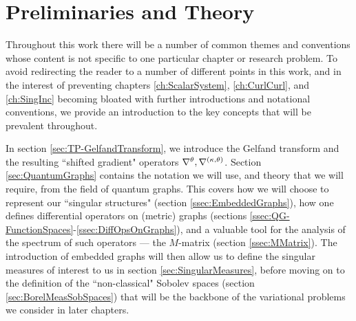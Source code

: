 \chapter{Preliminaries and Theory} \label{ch:TheoryPrelims}
Throughout this work there will be a number of common themes and conventions whose content is not specific to one particular chapter or research problem.
To avoid redirecting the reader to a number of different points in this work, and in the interest of preventing chapters \ref{ch:ScalarSystem}, \ref{ch:CurlCurl}, and \ref{ch:SingInc} becoming bloated with further introductions and notational conventions, we provide an introduction to the key concepts that will be prevalent throughout.

In section \ref{sec:TP-GelfandTransform}, we introduce the Gelfand transform and the resulting ``shifted gradient" operators $\nabla^{\theta}, \nabla^{\left( \kappa, \theta \right)}$.
Section \ref{sec:QuantumGraphs} contains the notation we will use, and theory that we will require, from the field of quantum graphs.
This covers how we will choose to represent our ``singular structures" (section \ref{ssec:EmbeddedGraphs}), how one defines differential operators on (metric) graphs (sections \ref{ssec:QG-FunctionSpaces}-\ref{ssec:DiffOpsOnGraphs}), and a valuable tool for the analysis of the spectrum of such operators --- the $M$-matrix (section \ref{ssec:MMatrix}).
The introduction of embedded graphs will then allow us to define the singular measures of interest to us in section \ref{sec:SingularMeasures}, before moving on to the definition of the ``non-classical" Sobolev spaces (section \ref{sec:BorelMeasSobSpaces}) that will be the backbone of the variational problems we consider in later chapters.









